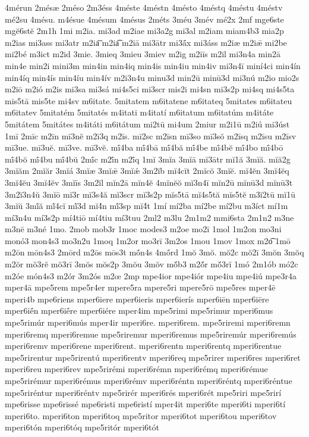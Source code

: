 {4mérun
2mésæ
2méso
2m3éss
4méste
4méstn
4mésto
4méstq
4méstu
4méstv
mé2su
4mésu.
m4ésue
4mésum
4mésus
2méts
3méu
3mév
mé2x
2mf
mge6ste
mgĕ6stĕ
2m1h
1mi
m2ia.
mi3ad
m2iae
mi3a2g
mi3al
m2iam
miam4b3
mia2p
m2ias
mi3ass
mi3atr
m2ia͞
m2ia͡
m2iā
mi3ātr
mi3ā́x
mi3áss
m2iæ
m2iǣ
mi2be
mi2bé
m3ict
m2id
3mie.
3mieq
3mieu
3miev
m2ig
m2iīs
m2il
mi3n4a
min2ā
min4e
min2i
mini3m
min4in
min4iq
min4is
min4iu
min4iv
mi3n4ī
miní4ci
min4ín
min4íq
min4ís
min4íu
min4ív
m2i3n4u
minu3d
min2ū
minū3d
mi3nú
m2io
mio2s
m2iō
m2ió
m2is
mi3sa
mi3sá
mi4s5ci
mi3scr
mis2i
mi4sn
mi3s2p
mi4sq
mi4s5ta
mis5tā
mis5te
mi4sv
m6itate.
5mitatem
m6itatene
m6itateq
5mitates
m6itateu
m6itatev
5mitatém
5mitatés
m4itati
m4itatí
m6itatum
m6itatúm
m4itáte
5mitátem
5mitátes
m4itáti
m6itátum
mi2tū
mi4um
2miur
m2i1ū
m2iú
mi3úst
1mī
2mīc
m2īn
mī3nĕ
m2ī3q
m2īs.
mī2sc
m2īsn
mī3so
mī3sŏ
m2īsq
m2īsu
m2īsv
mī3ue.
mī3uĕ.
mī3ve.
mī3vĕ.
mī́4ba
mī́4bā
mī́4bă
mī́4be
mī́4bĕ
mī́4bo
mī́4bō
mī́4bŏ
mī́4bu
mī́4bŭ
2mī́c
m2ī́n
m2ī́q
1mĭ
3mĭa
3mĭā
mĭ3ātr
mĭ1ă
3mĭă.
mĭă2g
3mĭăm
2mĭăr
3mĭá
3mĭæ
3mĭǣ
3mĭǽ
3m2ĭb
mĭ4cĭt
2mĭcŏ
3mĭĕ.
mĭ4ĕn
3mĭ4ĕq
3mĭ4ĕu
3mĭ4ĕv
3mĭīs
3m2ĭl
mĭn2ā
mĭn4ĕ
4mĭnĕŏ
mĭ3n4ī
mĭn2ū
mĭnū3d
mĭnū3t
3m2ĭ3n4ŭ
3mĭō
mĭ3r
mĭ3s4ă
mĭ3scr
mĭ3s2p
mĭs5tā
mĭ4s5tă
mĭs5tĕ
m3ĭ2tū
mĭ1ū
3mĭŭ
3mĭ́ă
mĭ́4cĭ
mĭ́3d
mĭ4́n
mĭ́3sp
mĭ4́t
1mí
mí2ba
mí2be
mí2bu
m3íct
mí1m
mí3n4u
mí3s2p
mí4tiō
mí4tiu
mí3tuu
2ml2
m3lu
2m1m2
mmi6sta
2m1n2
m3ne
m3nē
m3né
1mo.
2mob
mob3r
1moc
modes3
m2oe
mo2ī
1mol
1m2on
mo3ni
monó3
mon4s3
mo3n2u
1moq
1m2or
mo3rī
3m2os
1mou
1mov
1mox
m2o͡
1mō
m2ōn
mōn4s3
2mōrd
m2ōs
mōs3t
mṓn4s
4mṓrd
1mŏ
3mŏ.
mŏ2c
mŏ2ī
3mŏn
3mŏq
m2ŏr
mŏ3rĕ
mŏ3rī
3mŏs
mŏs2p
3mŏu
3mŏv
mŏ́b3
m2ŏ́r
mŏ́3rĭ
1mó
2m1ób
mó2c
m2óe
món4s3
m2ór
3m2ós
m2œ
2mp
mpe4ior
mpe4iór
mpe4iu
mpe4iú
mpe3r4a
mper4ā
mpe5rem
mpe5r4er
mpere5ra
mpere5ri
mpere5rō
mpe5res
mper4ē
mperi4b
mpe6riens
mper6iere
mper6ieris
mper6ierís
mper6iēn
mper6iēre
mper6iḗn
mper6iḗre
mper6iére
mper4im
mpe5rimi
mpe5rimur
mperi6mus
mpe5rimúr
mperi6mús
mper4ir
mperi6re.
mperi6rem.
mpe5riremi
mperi6remn
mperi6remq
mperi6remue
mpe5riremur
mperi6remus
mpe5riremúr
mperi6remús
mperi6remv
mperi6rene
mperi6rent.
mperi6rentn
mperi6rentq
mperi6rentue
mpe5rirentur
mpe5rirentú
mperi6rentv
mperi6req
mpe5rirer
mperi6res
mperi6ret
mperi6reu
mperi6rev
mpe5rirémi
mperi6rémn
mperi6rémq
mperi6rémue
mpe5rirémur
mperi6rémus
mperi6rémv
mperi6réntn
mperi6réntq
mperi6réntue
mpe5riréntur
mperi6réntv
mpe5rirér
mperi6rés
mperi6rét
mpe5riri
mpe5rirí
mpe6risse
mpe6rissé
mpe6risti
mpe6ristí
mper4it
mperi6te
mperi6ti
mperi6tí
mperi6to.
mperi6ton
mperi6toq
mpe5ritor
mperi6tot
mperi6tou
mperi6tov
mperi6tón
mperi6tóq
mpe5ritór
mperi6tót
}
